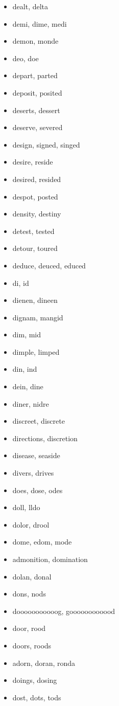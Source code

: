\documentclass[a4wide,11pt]{report}
\begin{document}
\begin{itemize}
  \item dealt, delta
  \item demi, dime, medi
  \item demon, monde
  \item deo, doe
  \item depart, parted
  \item deposit, posited
  \item deserts, dessert
  \item deserve, severed
  \item design, signed, singed
  \item desire, reside
  \item desired, resided
  \item despot, posted
  \item density, destiny
  \item detest, tested
  \item detour, toured
  \item deduce, deuced, educed
  \item di, id
  \item dienen, dineen
  \item dignam, mangid
  \item dim, mid
  \item dimple, limped
  \item din, ind
  \item dein, dine
  \item diner, nidre
  \item discreet, discrete
  \item directions, discretion
  \item disease, seaside
  \item divers, drives
  \item does, dose, odes
  \item doll, lldo
  \item dolor, drool
  \item dome, edom, mode
  \item admonition, domination
  \item dolan, donal
  \item dons, nods
  \item dooooooooooog, goooooooooood
  \item door, rood
  \item doors, roods
  \item adorn, doran, ronda
  \item doings, dosing
  \item dost, dots, tods

\end{itemize}
\end{document}

